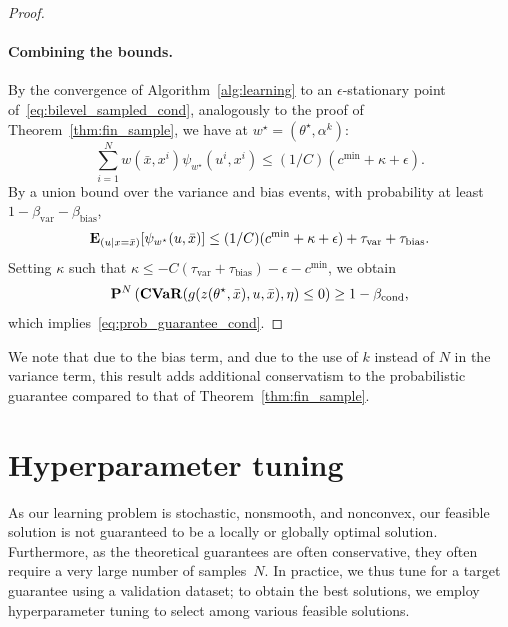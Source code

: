 \begin{proof}
\paragraph{Combining the bounds.}
By the convergence of Algorithm~\ref{alg:learning} to an $\epsilon$-stationary point of~\eqref{eq:bilevel_sampled_cond}, analogously to the proof of Theorem~\ref{thm:fin_sample}, we have at $w^\star = (\theta^\star, \alpha^k)$:
$$\sum_{i=1}^N w(\bar{x}, x^i) \psi_{w^\star}(u^i, x^i) \leq (1/C)(c^{\min} + \kappa + \epsilon).$$
By a union bound over the variance and bias events, with probability at least $1 - \beta_{\mathrm{var}} - \beta_{\mathrm{bias}}$,
$$\mathbf{E}_{(u | x = \bar{x})}[\psi_{w^\star}(u, \bar{x})] \leq (1/C)(c^{\min} + \kappa + \epsilon) + \tau_{\mathrm{var}} +\tau_{\mathrm{bias}} .$$
Setting $\kappa$ such that $\kappa \leq -C(\tau_{\mathrm{var}} + \tau_{\mathrm{bias}} ) - \epsilon - c^{\min}$, we obtain
$${\mathbf P}^{N}\left (\mathop{\bf CVaR}(g(z(\theta^\star,\bar{x}),u,\bar{x}),\eta)\leq 0 \right ) \geq 1 - \beta_{\mathrm{cond}},$$
which implies~\eqref{eq:prob_guarantee_cond}.
\end{proof}

We note that due to the bias term, and due to the use of $k$ instead of $N$ in the variance term, this result adds additional conservatism to the probabilistic guarantee compared to that of Theorem~\ref{thm:fin_sample}.  


\section{Hyperparameter tuning}
\label{sec:hyper}
As our learning problem is stochastic, nonsmooth, and nonconvex, our feasible solution is not guaranteed to be a locally or globally optimal solution. 
Furthermore, as the theoretical guarantees are often conservative, they often require a very large number of samples~$N$. %
In practice, we thus tune for a target guarantee using a validation dataset; to obtain the best solutions, we employ hyperparameter tuning to select among various feasible solutions.

